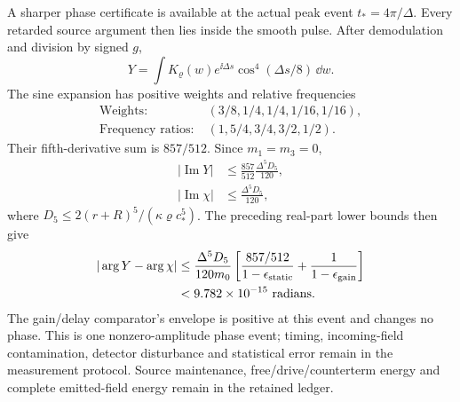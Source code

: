 A sharper phase certificate is available at the actual peak event $t_*=4\pi/\Delta$. Every retarded source argument then lies inside the smooth pulse. After demodulation and division by signed $g$,
\[
 Y=\int K_{\varrho}(w)e^{\ii\Delta s}
       \cos^4(\Delta s/8)\,\dd w.
\]
The sine expansion has positive weights and relative frequencies
\[
 \begin{aligned}
 \text{Weights}:\;&(3/8,1/4,1/4,1/16,1/16),\\
 \text{Frequency ratios}:\;&(1,5/4,3/4,3/2,1/2).
 \end{aligned}
\]
Their fifth-derivative sum is $857/512$. Since $m_1=m_3=0$,
\[
 \begin{aligned}
 |\operatorname{Im}Y|&\le\frac{857}{512}\frac{\Delta^5D_5}{120},\\
 |\operatorname{Im}\chi|&\le\frac{\Delta^5D_5}{120},
 \end{aligned}
\]
where $D_5\le2(r+R)^5/(\kappa\varrho c_*^5)$. The preceding real-part lower bounds then give
\[
\begin{split}
 |\arg Y-\arg\chi|\le{}&\frac{\Delta^5D_5}{120m_0}
 \left[\frac{857/512}{1-\epsilon_{\rm static}}
       +\frac1{1-\epsilon_{\rm gain}}\right]\\
 <{}&9.782\times10^{-15}\ \text{radians}.
\end{split}
\]
The gain/delay comparator's envelope is positive at this event and changes no phase. This is one nonzero-amplitude phase event; timing, incoming-field contamination, detector disturbance and statistical error remain in the measurement protocol. Source maintenance, free/drive/counterterm energy and complete emitted-field energy remain in the retained ledger.
